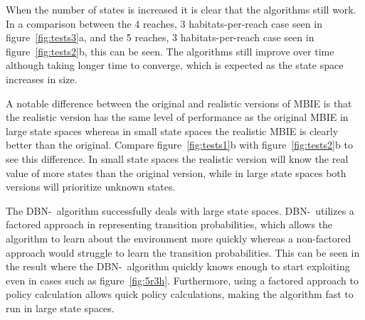 When the number of states is increased it is clear that the algorithms still
work. In a comparison between the 4 reaches, 3 habitats-per-reach case seen in
figure~\ref{fig:tests3}a, and the 5 reaches, 3 habitats-per-reach case seen
in figure~\ref{fig:tests2}b, this can be seen. The algorithms still improve
over time although taking longer time to converge, which is expected as the
state space increases in size. 

A notable difference between the original and realistic versions of MBIE is
that the realistic version has the same level of performance as the original
MBIE in large state spaces whereas in small state spaces the realistic MBIE
is clearly better than the original. Compare figure~\ref{fig:tests1}b with
figure~\ref{fig:tests2}b to see this difference. In small state spaces the
realistic version will know the real value of more states than the original
version, while in large state spaces both versions will prioritize unknown
states.

The DBN-\etre\ algorithm successfully deals with large state spaces. DBN-\etre\
utilizes a factored approach in representing transition probabilities, which
allows the algorithm to learn about the environment more quickly whereas a
non-factored approach would struggle to learn the transition probabilities.
This can be seen in the result where the DBN-\etre\ algorithm quickly knows
enough to start exploiting even in cases such as figure~\ref{fig:5r3h}.
Furthermore, using a factored approach to policy calculation allows quick
policy calculations, making the algorithm fast to run in large state spaces.
